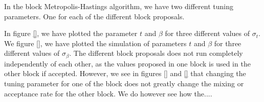 In the block Metropolis-Hastings algorithm, we have two different tuning parameters. One for each of the different block proposals. 


 In figure \ref{}, we have plotted the parameter $t$ and $\beta$ for three different values of $\sigma_t$. We figure \ref{}, we have plotted the simulation of parameters $t$ and $\beta$ for three different values of $\sigma_{\beta}$. The different block proposals does not run completely independently of each other, as the values proposed in one block is used in the other block if accepted. However, we see in figures \ref{} and \ref{} that changing the tuning parameter for one of the block does not greatly change the mixing or acceptance rate for the other block. We do however see how the.... 
